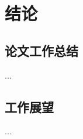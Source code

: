 \section*{结论}


{
\renewcommand{\thesubsection}{\arabic{subsection}.}
\setcounter{subsection}{0}
\subsection{论文工作总结}
...

\subsection{工作展望}
...

}

\newpage
